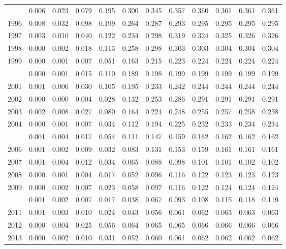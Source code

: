\documentclass[
]{article}
\begin{document}
\begin{longtable}[t]{lrrrrrrrrrrr}
\addlinespace
1995 & 0.006 & 0.023 & 0.079 & 0.195 & 0.300 & 0.345 & 0.357 & 0.360 & 0.361 & 0.361 & 0.361\\
1996 & 0.008 & 0.032 & 0.098 & 0.199 & 0.264 & 0.287 & 0.293 & 0.295 & 0.295 & 0.295 & 0.295\\
1997 & 0.003 & 0.010 & 0.040 & 0.122 & 0.234 & 0.298 & 0.319 & 0.324 & 0.325 & 0.326 & 0.326\\
1998 & 0.000 & 0.002 & 0.018 & 0.113 & 0.258 & 0.298 & 0.303 & 0.303 & 0.304 & 0.304 & 0.304\\
1999 & 0.000 & 0.001 & 0.007 & 0.051 & 0.163 & 0.215 & 0.223 & 0.224 & 0.224 & 0.224 & 0.224\\
\addlinespace
2000 & 0.000 & 0.001 & 0.015 & 0.110 & 0.189 & 0.198 & 0.199 & 0.199 & 0.199 & 0.199 & 0.199\\
2001 & 0.001 & 0.006 & 0.030 & 0.105 & 0.195 & 0.233 & 0.242 & 0.244 & 0.244 & 0.244 & 0.244\\
2002 & 0.000 & 0.000 & 0.004 & 0.028 & 0.132 & 0.253 & 0.286 & 0.291 & 0.291 & 0.291 & 0.291\\
2003 & 0.002 & 0.008 & 0.027 & 0.080 & 0.164 & 0.224 & 0.248 & 0.255 & 0.257 & 0.258 & 0.258\\
2004 & 0.000 & 0.001 & 0.007 & 0.034 & 0.112 & 0.194 & 0.225 & 0.232 & 0.233 & 0.234 & 0.234\\
\addlinespace
2005 & 0.001 & 0.004 & 0.017 & 0.054 & 0.111 & 0.147 & 0.159 & 0.162 & 0.162 & 0.162 & 0.162\\
2006 & 0.001 & 0.002 & 0.009 & 0.032 & 0.083 & 0.131 & 0.153 & 0.159 & 0.161 & 0.161 & 0.161\\
2007 & 0.001 & 0.004 & 0.012 & 0.034 & 0.065 & 0.088 & 0.098 & 0.101 & 0.101 & 0.102 & 0.102\\
2008 & 0.000 & 0.001 & 0.004 & 0.017 & 0.052 & 0.096 & 0.116 & 0.122 & 0.123 & 0.123 & 0.123\\
2009 & 0.000 & 0.002 & 0.007 & 0.023 & 0.058 & 0.097 & 0.116 & 0.122 & 0.124 & 0.124 & 0.124\\
\addlinespace
2010 & 0.001 & 0.002 & 0.007 & 0.017 & 0.038 & 0.067 & 0.093 & 0.108 & 0.115 & 0.118 & 0.119\\
2011 & 0.001 & 0.003 & 0.010 & 0.024 & 0.043 & 0.056 & 0.061 & 0.062 & 0.063 & 0.063 & 0.063\\
2012 & 0.000 & 0.004 & 0.025 & 0.056 & 0.064 & 0.065 & 0.065 & 0.066 & 0.066 & 0.066 & 0.066\\
2013 & 0.000 & 0.002 & 0.010 & 0.031 & 0.052 & 0.060 & 0.061 & 0.062 & 0.062 & 0.062 & 0.062\\

\end{longtable}
\end{document}
